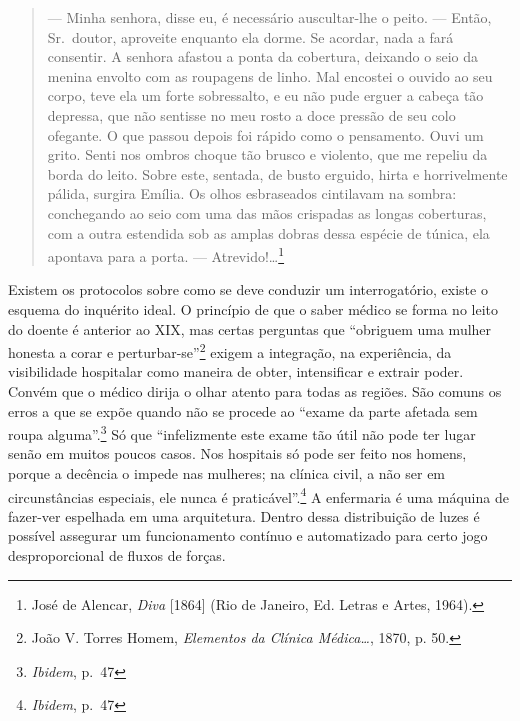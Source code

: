 \begin{quote}
--- Minha senhora, disse eu, é necessário auscultar-lhe o peito. ---
Então, Sr.~doutor, aproveite enquanto ela dorme. Se acordar, nada a fará
consentir. A senhora afastou a ponta da cobertura, deixando o seio da
menina envolto com as roupagens de linho. Mal encostei o ouvido ao seu
corpo, teve ela um forte sobressalto, e eu não pude erguer a cabeça tão
depressa, que não sentisse no meu rosto a doce pressão de seu colo
ofegante. O que passou depois foi rápido como o pensamento. Ouvi um
grito. Senti nos ombros choque tão brusco e violento, que me repeliu da
borda do leito. Sobre este, sentada, de busto erguido, hirta e
horrivelmente pálida, surgira Emília. Os olhos esbraseados cintilavam na
sombra: conchegando ao seio com uma das mãos crispadas as longas
coberturas, com a outra estendida sob as amplas dobras dessa espécie de
túnica, ela apontava para a porta. --- Atrevido!\dots{}\footnote{José de
  Alencar, \textit{Diva} {[}1864{]} (Rio de Janeiro, Ed. Letras e Artes,
  1964).}
\end{quote}

Existem os protocolos sobre como se deve conduzir um interrogatório,
existe o esquema do inquérito ideal. O princípio de que o saber médico
se forma no leito do doente é anterior ao XIX, mas certas perguntas que
``obriguem uma mulher honesta a corar e perturbar-se''\footnote{João V.
  Torres Homem, \textit{Elementos da Clínica Médica\ldots{}}, 1870, p. 50.}
exigem a integração, na experiência, da visibilidade hospitalar como
maneira de obter, intensificar e extrair poder. Convém que o médico
dirija o olhar atento para todas as regiões. São comuns os erros a que
se expõe quando não se procede ao ``exame da parte afetada sem roupa
alguma''.\footnote{\textit{Ibidem}, p.~47} Só que ``infelizmente este
exame tão útil não pode ter lugar senão em muitos poucos casos. Nos
hospitais só pode ser feito nos homens, porque a decência o impede nas
mulheres; na clínica civil, a não ser em circunstâncias especiais, ele
nunca é praticável''.\footnote{\textit{Ibidem}, p.~47} A enfermaria é uma
máquina de fazer-ver espelhada em uma arquitetura. Dentro dessa
distribuição de luzes é possível assegurar um funcionamento contínuo e
automatizado para certo jogo desproporcional de fluxos de forças.

